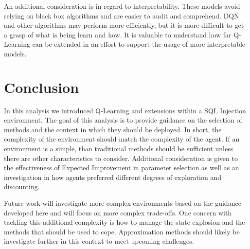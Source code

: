\documentclass[conference]{IEEEtran}
\begin{document}
An additional consideration is in regard to interpretability. These models avoid relying on black box algorithms and are easier to audit and comprehend. DQN and other algorithms may perform more efficiently, but it is more difficult to get a grasp of what is being learn and how. It is valuable to understand how far Q-Learning can be extended in an effort to support the usage of more interpretable models.  

\section{Conclusion}
In this analysis we introduced Q-Learning and extensions within a SQL Injection environment. The goal of this analysis is to provide guidance on the selection of methods and the context in which they should be deployed. In short, the complexity of the environment should match the complexity of the agent. If an environment is a simple, than traditional methods should be sufficient unless there are other characteristics to consider. Additional consideration is given to the effectiveness of Expected Improvement in parameter selection as well as an investigation in how agents preferred different degrees of exploration and discounting. 

Future work will investigate more complex environments based on the guidance developed here and will focus on more complex trade-offs. One concern with tackling this additional complexity is how to manage the state explosion and the methods that should be used to cope. Approximation methods should likely be investigate further in this context to meet upcoming challenges. 
\end{document}

